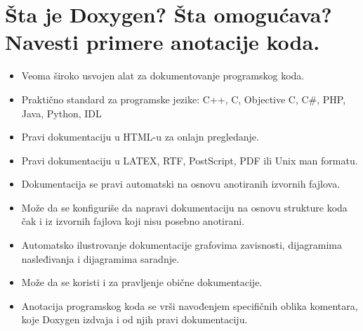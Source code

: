 \documentclass[a4paper]{article}
\begin{document}
\section{Šta je Doxygen? Šta omogućava? Navesti primere anotacije koda.}
  \begin{itemize}
    \item Veoma široko usvojen alat za dokumentovanje programskog koda.
    \item Praktično standard za programske jezike: C++, C, Objective	C, C\#, PHP, Java, Python, IDL
    \item Pravi dokumentaciju u HTML-u za onlajn pregledanje.
    \item Pravi dokumentaciju u LATEX, RTF, PostScript, PDF ili Unix man formatu.
    \item Dokumentacija se pravi automatski na osnovu anotiranih izvornih fajlova. 
    \item Može da se konfiguriše da napravi dokumentaciju na osnovu strukture koda čak i iz 
          izvornih fajlova koji nisu posebno anotirani. 
    \item Automatsko ilustrovanje dokumentacije 
          grafovima zavisnosti, dijagramima nasleđivanja i dijagramima saradnje.
    \item Može da se koristi i za pravljenje obične dokumentacije.
    \item Anotacija programskog koda se vrši navođenjem specifičnih oblika komentara, 
          koje Doxygen izdvaja i od njih pravi dokumentaciju.
  \end{itemize}
\end{document}
